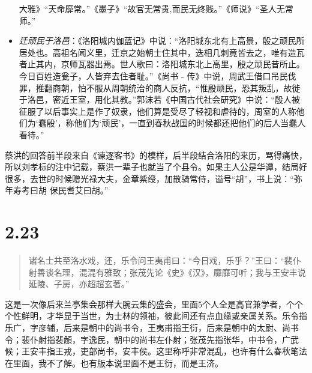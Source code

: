 \documentclass[]{book}
\begin{document}
\begin{itemize}
  大雅》``天命靡常。''《墨子》``故官无常贵,而民无终贱。''《师说》``圣人无常师。''
\item
  \emph{迁顽民于洛邑}：《洛阳城内伽蓝记》中说：``洛阳城东北有上高景，殷之顽民所居处也。高祖名闻义里，迁京之始朝士住其中，迭相几刺竟皆去之，唯有造瓦者止其内，京师瓦器出焉。世人歌曰：洛阳城东北上高里，殷之顽民昔所止。今日百姓造瓮子，人皆弃去住者耻。''《尚书
  -
  传》中说，周武王借口吊民伐罪，推翻商朝，怕不服从周朝统治的商人反抗，``惟殷顽民，恐其叛乱，故徙于洛邑，密近王室，用化其教。''郭沫若《中国古代社会研究》中说：``殷人被征服了以后事实上是作了奴隶，他们算是受尽了轻视和虐待的，周室的人称他们为`蠢殷'，称他们为`顽民'，一直到春秋战国的时候都还把他们的后人当蠢人看待。''
\end{itemize}

蔡洪的回答前半段来自《谏逐客书》的模样，后半段结合洛阳的来历，骂得痛快，所以刘孝标的注中记载，蔡洪一辈子也就当了个县令。如果主人公是华谭，结局好很多，去世的时候赠光禄大夫，金章紫绶，加散骑常侍，谥号``胡''，书上说：``弥年寿考曰胡
保民耆艾曰胡。''

\section{2.23}\label{section-69}

\begin{quote}
诸名士共至洛水戏，还，乐令问王夷甫曰：``今日戏，乐乎？''王曰：``裴仆射善谈名理，混混有雅致；张茂先论《史》《汉》，靡靡可听；我与王安丰说延陵、子房，亦超超玄著。''
\end{quote}

这是一次像后来兰亭集会那样大腕云集的盛会，里面5个人全是高官兼学者，个个个性鲜明，才华显于当世，为士林的领袖，彼此间还有点血缘或亲属关系。乐令指乐广，字彦辅，后来是朝中的尚书令，王夷甫指王衍，后来是朝中的太尉、尚书令；裴仆射指裴頠，字逸民，朝中的尚书左仆射；张茂先指张华，中书令，广武候；王安丰指王戎，吏部尚书，安丰侯。这里称呼非常混乱，也许有什么春秋笔法在里面，我不了解。也有版本说里面不是王衍，而是王济。
\end{document}
